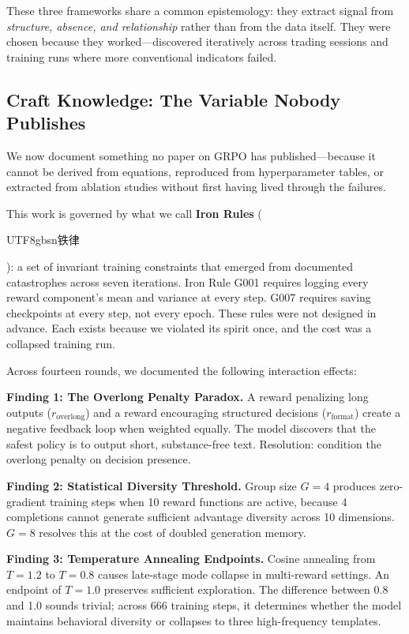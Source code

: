 \documentclass[11pt,a4paper]{article}
\begin{document}
These three frameworks share a common epistemology: they extract signal from \textit{structure, absence, and relationship} rather than from the data itself. They were chosen because they worked---discovered iteratively across trading sessions and training runs where more conventional indicators failed.

\subsection{Craft Knowledge: The Variable Nobody Publishes}

We now document something no paper on GRPO has published---because it cannot be derived from equations, reproduced from hyperparameter tables, or extracted from ablation studies without first having lived through the failures.

This work is governed by what we call \textbf{Iron Rules} (\begin{CJK}{UTF8}{gbsn}铁律\end{CJK}): a set of invariant training constraints that emerged from documented catastrophes across seven iterations. Iron Rule G001 requires logging every reward component's mean and variance at every step. G007 requires saving checkpoints at every step, not every epoch. These rules were not designed in advance. Each exists because we violated its spirit once, and the cost was a collapsed training run.

Across fourteen rounds, we documented the following interaction effects:

\textbf{Finding 1: The Overlong Penalty Paradox.} A reward penalizing long outputs ($r_{\text{overlong}}$) and a reward encouraging structured decisions ($r_{\text{format}}$) create a negative feedback loop when weighted equally. The model discovers that the safest policy is to output short, substance-free text. Resolution: condition the overlong penalty on decision presence.

\textbf{Finding 2: Statistical Diversity Threshold.} Group size $G=4$ produces zero-gradient training steps when 10 reward functions are active, because 4 completions cannot generate sufficient advantage diversity across 10 dimensions. $G=8$ resolves this at the cost of doubled generation memory.

\textbf{Finding 3: Temperature Annealing Endpoints.} Cosine annealing from $T=1.2$ to $T=0.8$ causes late-stage mode collapse in multi-reward settings. An endpoint of $T=1.0$ preserves sufficient exploration. The difference between 0.8 and 1.0 sounds trivial; across 666 training steps, it determines whether the model maintains behavioral diversity or collapses to three high-frequency templates.
\end{document}
